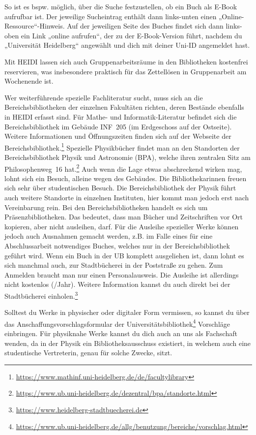 So ist es bspw. möglich, über die Suche festzustellen, ob ein Buch als E-Book aufrufbar ist. Der jeweilige Sucheintrag enthält dann links-unten einen „Online-Ressource“-Hinweis. Auf der jeweiligen Seite des Buches findet sich dann links-oben ein Link „online aufrufen“, der zu der E-Book-Version führt, nachdem du „Universität Heidelberg“ angewählt und dich mit deiner Uni-ID angemeldet hast.

Mit HEIDI lassen sich auch Gruppenarbeitsräume in den Bibliotheken kostenfrei reservieren, was insbesondere praktisch für das Zettellösen in Gruppenarbeit am Wochenende ist.

Wer weiterführende spezielle Fachliteratur sucht, muss sich an die Bereichsbibliotheken der einzelnen Fakultäten richten, deren Bestände ebenfalls in \gls{HEIDI} erfasst sind. Für Mathe- und Informatik-Literatur befindet sich die Bereichsbibliothek im Gebäude \gls{INF}~205 (im Erdgeschoss auf der Ostseite). Weitere Informationen und Öffnungszeiten finden sich auf der Webseite der Bereichsbibliothek.\footnote{\url{https://www.mathinf.uni-heidelberg.de/de/facultylibrary}} Spezielle Physikbücher findet man an den Standorten der Bereichsbibliothek Physik und Astronomie (BPA), welche ihren zentralen Sitz am Philosophenweg~16 hat.\footnote{\url{https://www.ub.uni-heidelberg.de/dezentral/bpa/standorte.html}} Auch wenn die Lage etwas abschreckend wirken mag, lohnt sich ein Besuch, alleine wegen des Gebäudes. Die Bibliothekarinnen freuen sich sehr über studentischen Besuch. Die Bereichsbibliothek der Physik führt auch weitere Standorte in einzelnen Instituten, hier kommt man jedoch erst nach Vereinbarung rein.
Bei den Bereichsbibliotheken handelt es sich um Präsenzbibliotheken. Das bedeutet, dass man Bücher und Zeitschriften vor Ort kopieren, aber nicht ausleihen, darf. Für die Ausleihe spezieller Werke können jedoch auch Ausnahmen gemacht werden, z.B. im Falle eines für eine Abschlussarbeit notwendiges Buches, welches nur in der Bereichsbibliothek geführt wird.
Wenn ein Buch in der UB komplett ausgeliehen ist, dann lohnt es sich manchmal auch, zur Stadtbücherei in der Poststraße zu gehen. Zum Anmelden braucht man nur einen Personalausweis. Die Ausleihe ist allerdings nicht kostenlos (/Jahr). Weitere Information kannst du auch direkt bei der Stadtbücherei einholen.\footnote{\url{https://www.heidelberg-stadtbuecherei.de}}

Solltest du Werke in physischer oder digitaler Form vermissen, so kannst du über das Anschaffungsvorschlagsformular der Universitätsbibliothek\footnote{\url{https://www.ub.uni-heidelberg.de/allg/benutzung/bereiche/vorschlag.html}} Vorschläge einbringen. Für physiknahe Werke kannst du dich auch an uns als Fachschaft wenden, da in der Physik ein Bibliotheksausschuss existiert, in welchem auch eine studentische Vertreterin, genau für solche Zwecke, sitzt.

